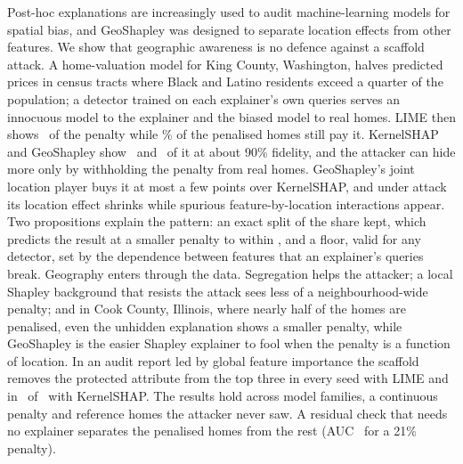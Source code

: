 Post-hoc explanations are increasingly used to audit machine-learning models for spatial bias, and GeoShapley was
designed to separate location effects from other features. We show that geographic awareness is no defence against a
scaffold attack. A home-valuation model for King County, Washington, halves predicted prices in census tracts where
Black and Latino residents exceed a quarter of the population; a detector trained on each explainer's own queries
serves an innocuous model to the explainer and the biased model to real homes. LIME then shows \FLIMEMatKept\ of the
penalty while \FLIMEMatFidPen\% of the penalised homes still pay it. KernelSHAP and GeoShapley show
\FKernelSHAPMatKept\ and \FGeoShapleyMatKept\ of it at about 90\% fidelity, and the attacker can hide more only by
withholding the penalty from real homes. GeoShapley's joint location player buys it at most a few points over
KernelSHAP, and under attack its location effect shrinks while spurious feature-by-location interactions appear.
Two propositions explain the pattern: an exact split of the share kept, which predicts the result at a smaller
penalty to within \SplitPredTenMax, and a floor, valid for any detector, set by the dependence between features that
an explainer's queries break. Geography enters through the data. Segregation helps the attacker; a local Shapley
background that resists the attack sees less of a neighbourhood-wide penalty; and in Cook County, Illinois, where
nearly half of the homes are penalised, even the unhidden explanation shows a smaller penalty, while GeoShapley is the
easier Shapley explainer to fool when the penalty is a function of location. In an audit report led by global feature
importance the scaffold removes the protected attribute from the top three in every seed with LIME and in
\AuditKernelSHAPMatPassN\ of \AuditKernelSHAPMatSeeds\ with KernelSHAP. The results hold across
model families, a continuous penalty and reference homes the attacker never saw. A residual check that needs no
explainer separates the penalised homes from the rest (AUC \EsevenAucLagScaffoldTen\ for a 21\% penalty).
